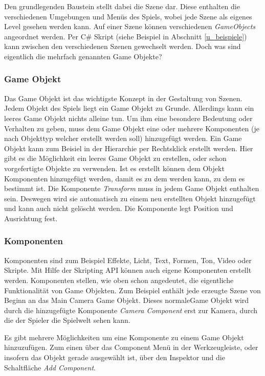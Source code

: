 Den grundlegenden Baustein stellt dabei die Szene dar. Diese enthalten die verschiedenen Umgebungen und Menüs des Spiels, wobei jede Szene als eigenes Level gesehen werden kann. Auf einer Szene können verschiedenen \textit{GameObjects} angeordnet werden. Per C\# Skript (siehe Beispiel in Abschnitt \ref{u_beispiele}) kann zwischen den verschiedenen Szenen gewechselt werden. Doch was sind eigentlich die mehrfach genannten Game Objekte? ~\cite{F_6.3.2.1_Scenes}

\subsubsection{Game Objekt}
Das Game Objekt ist das wichtigste Konzept in der Gestaltung von Szenen. Jedem Objekt des Spiels liegt ein Game Objekt zu Grunde. Allerdings kann ein leeres Game Objekt nichts alleine tun. Um ihm eine besondere Bedeutung oder Verhalten zu geben, muss dem Game Objekt eine oder mehrere Komponenten (je nach Objekttyp welcher erstellt werden soll) hinzugefügt werden. Ein Game Objekt kann zum Beisiel in der Hierarchie per Rechtsklick erstellt werden. Hier gibt es die Möglichkeit ein leeres Game Objekt zu erstellen, oder schon vorgefertigte Objekte zu verwenden. Ist es erstellt können dem Objekt Komponenten hinzugefügt werden, damit es zu dem werden kann, zu dem es bestimmt ist. Die Komponente \textit{Transform} muss in jedem Game Objekt enthalten sein. Deswegen wird sie automatisch zu einem neu erstellten Objekt hinzugefügt und kann auch nicht gelöscht werden. Die Komponente legt Position und Ausrichtung fest. ~\cite{F_6.3.2.2_GameObjekts}

\subsubsection{Komponenten}
Komponenten sind zum Beispiel Effekte, Licht, Text, Formen, Ton, Video oder Skripte. Mit Hilfe der Skripting API können auch eigene Komponenten erstellt werden. Komponenten stellen, wie oben schon angedeutet, die eigentliche Funktionalität von Game Objekten. Zum Beispiel enthält jede erzeugte Szene von Beginn an das Main Camera Game Objekt. Dieses \glqq normale\grqq Game Objekt wird durch die hinzugefügte Komponente \textit{Camera Component} erst zur Kamera, durch die der Spieler die Spielwelt sehen kann.

Es gibt mehrere Möglichkeiten um eine Komponente zu einem Game Objekt hinzuzufügen. Zum einen über das Component Menü in der Werkzeugleiste, oder insofern das Objekt gerade ausgewählt ist, über den Inspektor und die Schaltfläche \textit{Add Component}. 

